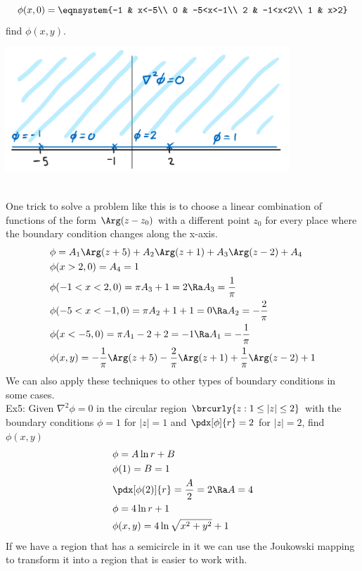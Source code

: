 \[\phi(x,0)=\eqnsystem{-1 & x<-5\\ 0 & -5<x<-1\\ 2 & -1<x<2\\ 1 & x>2}\]
find $\phi(x,y)$.\\
\centerline{\includegraphics[width=0.8\textwidth]{Images/ComplexAnalysisPictures/ArgumentLaplacian.png}}\\
One trick to solve a problem like this is to choose a linear combination of functions of the form $\Arg(z-z_0)$ with a different point $z_0$ for every place where the boundary condition changes along the x-axis.
\begin{align*}
    &\phi=A_1\Arg(z+5)+A_2\Arg(z+1)+A_3\Arg(z-2)+A_4\\
    &\phi(x>2,0)=A_4=1\\
    &\phi(-1<x<2,0)=\pi A_3+1=2\Ra A_3=\frac{1}{\pi}\\
    &\phi(-5<x<-1,0)=\pi A_2+1+1=0\Ra A_2=-\frac{2}{\pi}\\
    &\phi(x<-5,0)=\pi A_1-2+2=-1\Ra A_1=-\frac{1}{\pi}\\
    &\phi(x,y)=-\frac{1}{\pi}\Arg(z+5)-\frac{2}{\pi}\Arg(z+1)+\frac{1}{\pi}\Arg(z-2)+1
\end{align*}
We can also apply these techniques to other types of boundary conditions in some cases.\\
Ex5: Given $\nabla^2\phi=0$ in the circular region $\brcurly{z: 1\leq |z|\leq 2}$ with the boundary conditions $\phi=1$ for $|z|=1$ and $\pdx[\phi]{r}=2$ for $|z|=2$, find $\phi(x,y)$
\begin{align*}
    &\phi=A\ln r+B\\
    &\phi(1)=B=1\\
    &\pdx[\phi(2)]{r}=\frac{A}{2}=2\Ra A=4\\
    &\phi=4\ln r+1\\
    &\phi(x,y)=4\ln\sqrt{x^2+y^2}+1
\end{align*}
If we have a region that has a semicircle in it we can use the Joukowski mapping to transform it into a region that is easier to work with.\\
